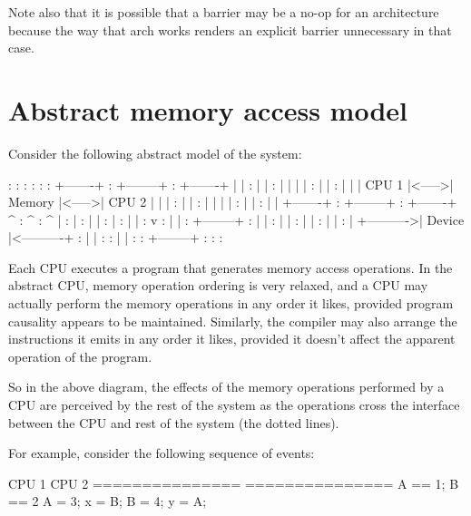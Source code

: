 Note also that it is possible that a barrier may be a no-op for an
architecture because the way that arch works renders an explicit barrier
unnecessary in that case.


\section{Abstract memory access model}

Consider the following abstract model of the system:

\begin{VerbatimU}
		            :                :
		            :                :
		            :                :
		+-------+   :   +--------+   :   +-------+
		|       |   :   |        |   :   |       |
		|       |   :   |        |   :   |       |
		| CPU 1 |<----->| Memory |<----->| CPU 2 |
		|       |   :   |        |   :   |       |
		|       |   :   |        |   :   |       |
		+-------+   :   +--------+   :   +-------+
		    ^       :       ^        :       ^
		    |       :       |        :       |
		    |       :       |        :       |
		    |       :       v        :       |
		    |       :   +--------+   :       |
		    |       :   |        |   :       |
		    |       :   |        |   :       |
		    +---------->| Device |<----------+
		            :   |        |   :
		            :   |        |   :
		            :   +--------+   :
		            :                :
\end{VerbatimU}

Each CPU executes a program that generates memory access operations.
In the abstract CPU, memory operation ordering is very relaxed, and a CPU may
actually perform the memory operations in any order it likes, provided
program causality appears to be maintained.
Similarly, the compiler may also arrange the instructions it emits in any
order it likes, provided it doesn't affect the apparent operation of the
program.

So in the above diagram, the effects of the memory operations performed by a
CPU are perceived by the rest of the system as the operations cross the
interface between the CPU and rest of the system (the dotted lines).


For example, consider the following sequence of events:

\begin{VerbatimU}
	CPU 1           CPU 2
	===============	===============
	{ A == 1; B == 2 }
	A = 3;          x = B;
	B = 4;          y = A;
\end{VerbatimU}


